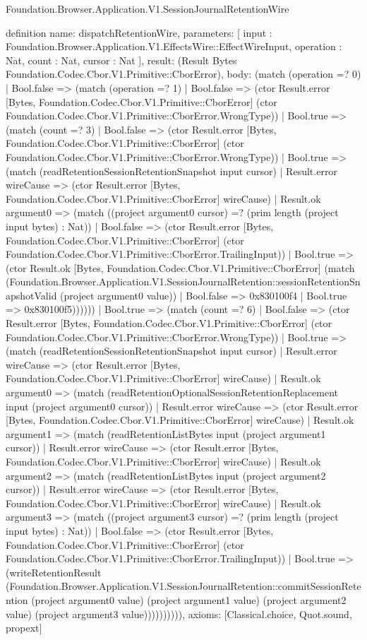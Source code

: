 \begin{lexlean}{Foundation.Browser.Application.V1.SessionJournalRetentionWire}
\begin{semanticmodule}
definition{
  name: dispatchRetentionWire,
  parameters: [
    input : Foundation.Browser.Application.V1.EffectsWire::EffectWireInput,
    operation : Nat,
    count : Nat,
    cursor : Nat
  ],
  result: (Result Bytes Foundation.Codec.Cbor.V1.Primitive::CborError),
  body: (match (operation =? 0)
    | Bool.false => (match (operation =? 1)
      | Bool.false => (ctor Result.error [Bytes, Foundation.Codec.Cbor.V1.Primitive::CborError] (ctor Foundation.Codec.Cbor.V1.Primitive::CborError.WrongType))
      | Bool.true => (match (count =? 3)
        | Bool.false => (ctor Result.error [Bytes, Foundation.Codec.Cbor.V1.Primitive::CborError] (ctor Foundation.Codec.Cbor.V1.Primitive::CborError.WrongType))
        | Bool.true => (match (readRetentionSessionRetentionSnapshot input cursor)
          | Result.error wireCause => (ctor Result.error [Bytes, Foundation.Codec.Cbor.V1.Primitive::CborError] wireCause)
          | Result.ok argument0 => (match ((project argument0 cursor) =? (prim length (project input bytes) : Nat))
            | Bool.false => (ctor Result.error [Bytes, Foundation.Codec.Cbor.V1.Primitive::CborError] (ctor Foundation.Codec.Cbor.V1.Primitive::CborError.TrailingInput))
            | Bool.true => (ctor Result.ok [Bytes, Foundation.Codec.Cbor.V1.Primitive::CborError] (match (Foundation.Browser.Application.V1.SessionJournalRetention::sessionRetentionSnapshotValid (project argument0 value))
              | Bool.false => 0x830100f4
              | Bool.true => 0x830100f5))))))
    | Bool.true => (match (count =? 6)
      | Bool.false => (ctor Result.error [Bytes, Foundation.Codec.Cbor.V1.Primitive::CborError] (ctor Foundation.Codec.Cbor.V1.Primitive::CborError.WrongType))
      | Bool.true => (match (readRetentionSessionRetentionSnapshot input cursor)
        | Result.error wireCause => (ctor Result.error [Bytes, Foundation.Codec.Cbor.V1.Primitive::CborError] wireCause)
        | Result.ok argument0 => (match (readRetentionOptionalSessionRetentionReplacement input (project argument0 cursor))
          | Result.error wireCause => (ctor Result.error [Bytes, Foundation.Codec.Cbor.V1.Primitive::CborError] wireCause)
          | Result.ok argument1 => (match (readRetentionListBytes input (project argument1 cursor))
            | Result.error wireCause => (ctor Result.error [Bytes, Foundation.Codec.Cbor.V1.Primitive::CborError] wireCause)
            | Result.ok argument2 => (match (readRetentionListBytes input (project argument2 cursor))
              | Result.error wireCause => (ctor Result.error [Bytes, Foundation.Codec.Cbor.V1.Primitive::CborError] wireCause)
              | Result.ok argument3 => (match ((project argument3 cursor) =? (prim length (project input bytes) : Nat))
                | Bool.false => (ctor Result.error [Bytes, Foundation.Codec.Cbor.V1.Primitive::CborError] (ctor Foundation.Codec.Cbor.V1.Primitive::CborError.TrailingInput))
                | Bool.true => (writeRetentionResult (Foundation.Browser.Application.V1.SessionJournalRetention::commitSessionRetention (project argument0 value) (project argument1 value) (project argument2 value) (project argument3 value)))))))))),
  axioms: [Classical.choice, Quot.sound, propext]
}


\end{semanticmodule}
\end{lexlean}
